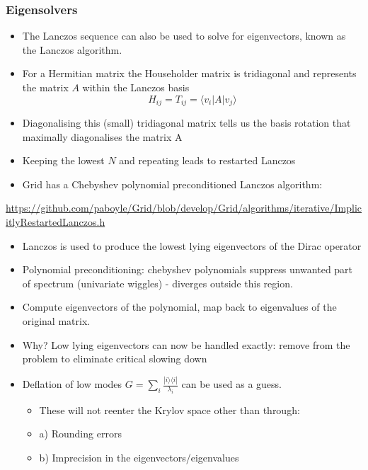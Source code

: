 \documentclass[pdf,ps,8pt]{beamer}
\newcommand{\link}[1]{\href{#1}{ {\color{blue} #1} }}
\begin{document}
  \begin{frame}[fragile]\small\frametitle{ Eigensolvers}
\begin{itemize}
\item   The Lanczos sequence can also be used to solve for eigenvectors, known as the Lanczos algorithm.
\item   For a Hermitian matrix the Householder matrix is tridiagonal and represents the matrix $A$ within the Lanczos basis
$$
H_{ij} = T_{ij} = \langle v_i | A | v_j \rangle
$$
\item   Diagonalising this (small) tridiagonal matrix tells us the basis rotation that maximally diagonalises the matrix A
\item   Keeping the lowest $N$ and repeating leads to restarted Lanczos
\item   Grid has a Chebyshev polynomial preconditioned Lanczos algorithm:
\end{itemize}
\link{https://github.com/paboyle/Grid/blob/develop/Grid/algorithms/iterative/ImplicitlyRestartedLanczos.h}
\begin{itemize}
\item Lanczos is used to produce the lowest lying eigenvectors of the Dirac operator
\item Polynomial preconditioning: chebyshev polynomials suppress unwanted part of spectrum (univariate wiggles) - diverges outside this region.
\item Compute eigenvectors of the polynomial, map back to eigenvalues of the original matrix.
\item Why? Low lying eigenvectors can now be handled exactly: remove from the problem to eliminate critical slowing down
\item Deflation of low modes $G = \sum_i  \frac{|i\rangle\langle i|}{\lambda_i}  $ can be used as a guess.\\
\begin{itemize}
\item      These will not reenter the Krylov space other than through:
\item a) Rounding errors
\item b) Imprecision in the eigenvectors/eigenvalues
\end{itemize}
\end{itemize}
  \end{frame}
\end{document}
